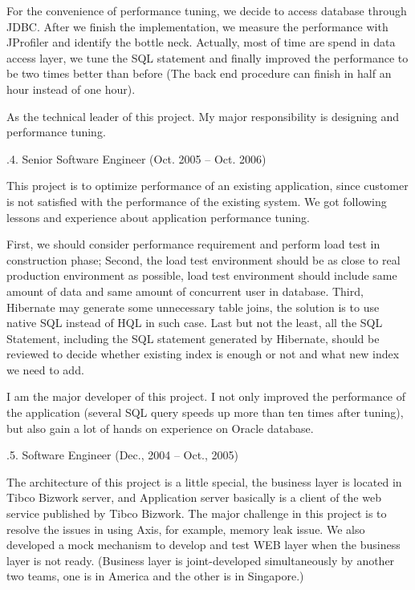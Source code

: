 For the convenience of performance tuning, we decide to access database through JDBC.
After we finish the implementation, we measure the performance with JProfiler and identify the
bottle neck. Actually, most of time are spend in data access layer, we tune
the SQL statement and finally improved the performance to be two times better than before
(The back end procedure can finish in half an hour instead of one hour).

As the technical leader of this project. My major responsibility is
designing and performance tuning.

.4. Senior Software Engineer (Oct. 2005 -- Oct. 2006)\par
\noindent
This project is to optimize performance of an existing application, 
since customer is not satisfied with the performance of the existing system. 
We got following lessons and experience about application performance tuning. 

First, we should consider performance requirement and perform load test in construction phase; 
Second, the load test environment should be as close to real production environment as possible,
load test environment should include same amount of data and same amount of concurrent user in database. 
Third, Hibernate may generate some unnecessary table joins, the solution
is to use native SQL instead of HQL in such case. 
Last but not the least, all the SQL Statement, including the SQL statement 
generated by Hibernate, should be reviewed to decide whether existing index 
is enough or not and what new index we need to add. 

I am the major developer of this project. I not only improved the performance
of the application (several SQL query speeds up more than ten times after tuning),
but also gain a lot of hands on experience on Oracle database.


.5. Software Engineer (Dec., 2004 -- Oct., 2005)\par
\noindent
The architecture of this project is a little special, the business layer is located 
in Tibco Bizwork server, and Application server  basically is a client of the 
web service published by Tibco Bizwork. The major challenge in this project 
is to resolve the issues in using Axis, for example, memory leak issue. 
We also developed a mock mechanism to develop and test WEB layer when the
 business layer is not ready. (Business layer is joint-developed simultaneously 
 by another two teams, one is in America and the other is in Singapore.)

